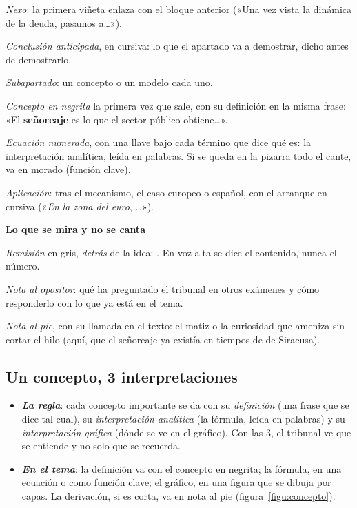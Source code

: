 \documentclass[11pt]{article}
\begin{document}
\begin{infografia}[!tb]
\begin{minipage}[t]{7.75cm}
 \emph{Nexo}: la primera viñeta enlaza con el bloque anterior («Una vez vista la dinámica de la deuda, pasamos a…»).\par
{} \emph{Conclusión anticipada}, en cursiva: lo que el apartado va a demostrar, dicho antes de demostrarlo.\par
{} \emph{Subapartado}: un concepto o un modelo cada uno.\par
{} \emph{Concepto en negrita} la primera vez que sale, con su definición en la misma frase: «El \textbf{señoreaje} es lo que el sector público obtiene…».\par
{} \emph{Ecuación numerada}, con una llave bajo cada término que dice qué es: la interpretación analítica, leída en palabras. Si se queda en la pizarra todo el cante, va en morado (función clave).\par
{} \emph{Aplicación}: tras el mecanismo, el caso europeo o español, con el arranque en cursiva («\emph{En la zona del euro}, …»).\par
{\bfseries\color{tceemorado}Lo que se mira y no se canta}\par
{} \emph{Remisión} en gris, \emph{detrás} de la idea: . En voz alta se dice el contenido, nunca el número.\par
{} \emph{Nota al opositor}: qué ha preguntado el tribunal en otros exámenes y cómo responderlo con lo que ya está en el tema.\par
{} \emph{Nota al pie}, con su llamada en el texto: el matiz o la curiosidad que ameniza sin cortar el hilo (aquí, que el señoreaje ya existía en tiempos de  de Siracusa).\par
\end{minipage}
\end{infografia}

\subsection{Un concepto, 3 interpretaciones}\label{sec:concepto}

\begin{itemize}
\item \textbf{\emph{La regla}}: cada concepto importante se da con su \emph{definición} (una frase que se dice tal cual), su \emph{interpretación analítica} (la fórmula, leída en palabras) y su \emph{interpretación gráfica} (dónde se ve en el gráfico). Con las 3, el tribunal ve que se entiende y no solo que se recuerda.
\item \textbf{\emph{En el tema}}: la definición va con el concepto en negrita; la fórmula, en una ecuación o como función clave; el gráfico, en una figura que se dibuja por capas. La derivación, si es corta, va en nota al pie (figura~\ref{figu:concepto}).
\end{itemize}
\end{document}
